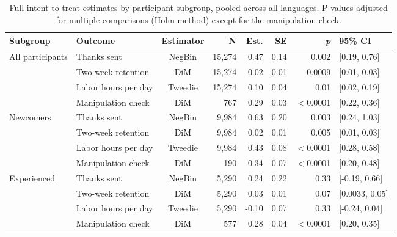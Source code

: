 \begin{table}[ht]
\centering
\small
\caption{Full intent-to-treat estimates by participant subgroup, pooled across all languages. P-values adjusted for multiple comparisons (Holm method) except for the manipulation check.}
\label{table:full_itt_subgroup}
\begin{tabular}{llcrrrrl}
\toprule
\textbf{Subgroup} & \textbf{Outcome} & \textbf{Estimator} & \textbf{N} & \textbf{Est.} & \textbf{SE} & \textbf{\textit{p}} & \textbf{95\% CI} \\
\midrule
All participants & Thanks sent & NegBin & 15,274 & 0.47 & 0.14 & 0.002 & [0.19, 0.76] \\
 & Two-week retention & DiM & 15,274 & 0.02 & 0.01 & 0.0009 & [0.01, 0.03] \\
 & Labor hours per day & Tweedie & 15,274 & 0.10 & 0.04 & 0.01 & [0.02, 0.19] \\
 & Manipulation check & DiM & 767 & 0.29 & 0.03 & $<$0.0001 & [0.22, 0.36] \\
\addlinespace
Newcomers & Thanks sent & NegBin & 9,984 & 0.63 & 0.20 & 0.003 & [0.24, 1.03] \\
 & Two-week retention & DiM & 9,984 & 0.02 & 0.01 & 0.005 & [0.01, 0.03] \\
 & Labor hours per day & Tweedie & 9,984 & 0.43 & 0.08 & $<$0.0001 & [0.28, 0.58] \\
 & Manipulation check & DiM & 190 & 0.34 & 0.07 & $<$0.0001 & [0.20, 0.48] \\
\addlinespace
Experienced & Thanks sent & NegBin & 5,290 & 0.24 & 0.22 & 0.33 & [-0.19, 0.66] \\
 & Two-week retention & DiM & 5,290 & 0.03 & 0.01 & 0.07 & [0.0033, 0.05] \\
 & Labor hours per day & Tweedie & 5,290 & -0.10 & 0.07 & 0.33 & [-0.24, 0.04] \\
 & Manipulation check & DiM & 577 & 0.28 & 0.04 & $<$0.0001 & [0.20, 0.35] \\
\bottomrule
\end{tabular}
\end{table}

